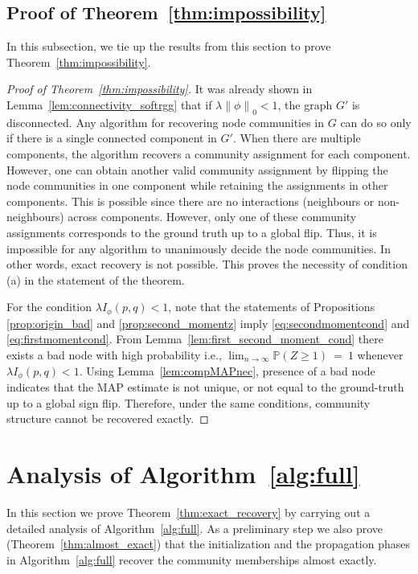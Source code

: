 \documentclass[letterpaper,11pt]{article}
\theoremstyle{definition}
\def\P{\mathbb{P}}
\def\weq{ \ = \ }
\newcommand{\zeronorm}[1]{{\lVert#1\rVert}_0}
\numberwithin{equation}{section}
\newcommand{\la}{\lambda}
\theoremstyle{definition}
\def\P{\mathbb{P}}
\def\weq{ \ = \ }
\newcommand{\zeronorm}[1]{{\lVert#1\rVert}_0}
\numberwithin{equation}{section}
\newcommand{\la}{\lambda}
\theoremstyle{thmstyletwo}%
\begin{document}
\subsection{Proof of Theorem~\ref{thm:impossibility}}
\label{sec:proof_impossibility}
In this subsection, we tie up the results from this section to prove Theorem~\ref{thm:impossibility}.
\begin{proof}[Proof of Theorem~\ref{thm:impossibility}]
It was already shown in Lemma~\ref{lem:connectivity_softrgg} that if $\la \zeronorm{\phi} < 1$, the graph $G'$ is disconnected. 
Any algorithm for recovering node communities in $G$ can do so only if there is a single connected component in $G'$. When there are multiple components, the algorithm recovers a community assignment for each component. However, one can obtain another valid community assignment by flipping the node communities in one component while retaining the assignments in other components. This is possible since there are no interactions (neighbours or non-neighbours) across components. However, only one of these community assignments corresponds to the ground truth up to a global flip. Thus,
it is impossible for any algorithm to unanimously decide the node communities. In other words, exact recovery is not possible. This proves the necessity of condition (a) in the statement of the theorem.

For the condition $\la I_{\phi}(p,q) < 1$, note that the statements of Propositions \ref{prop:origin_bad} and \ref{prop:second_momentz} imply  \eqref{eq:secondmomentcond} and \eqref{eq:firstmomentcond}. From Lemma~\ref{lem:first_second_moment_cond} there exists a bad node with high probability i.e., $\lim_{n\to \infty}\P(Z \ge 1) \weq 1$ whenever $\la I_\phi(p,q) <1$. Using Lemma~\ref{lem:compMAPnec}, presence of a bad node indicates that the MAP estimate is not unique, or not equal to the ground-truth up to a global sign flip. Therefore, under the same conditions, community structure cannot be recovered exactly.
\end{proof}



\section{Analysis of Algorithm~\ref{alg:full}}
\label{sec:achievability}

In this section we prove Theorem~\ref{thm:exact_recovery} by 
carrying out a detailed analysis of Algorithm~\ref{alg:full}.
As a preliminary step we also prove (Theorem~\ref{thm:almost_exact}) that
the initialization and the propagation phases in Algorithm~\ref{alg:full} recover the community memberships almost exactly.
\end{document}

